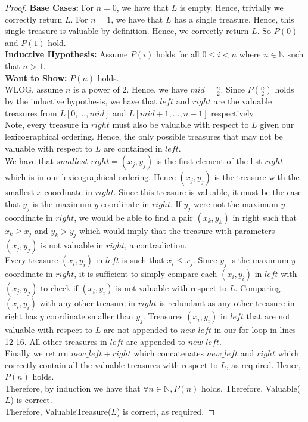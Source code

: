 \documentclass[12pt]{article}
\newcommand{\N}{\mathbb{N}}
\begin{document}
\begin{proof}
\textbf{Base Cases:} For $n = 0$, we have that $L$ is empty. Hence, trivially we correctly return $L$. For $n = 1$, we have that $L$ has a single treasure. Hence, this single treasure is valuable by definition. Hence, we correctly return $L$. So $P(0)$ and $P(1)$ hold. \\


\textbf{Inductive Hypothesis:} Assume $P(i)$ holds for all $0 \leq i < n$ where $n \in \N$ such that $n > 1$. \\

\textbf{Want to Show:} $P(n)$ holds. \\

WLOG, assume $n$ is a power of 2. Hence, we have $mid = \frac{n}{2}$. Since $P(\frac{n}{2})$ holds by the inductive hypothesis, we have that $left$ and $right$ are the valuable treasures from $L[0,...,mid]$ and $L[mid + 1,...,n-1]$ respectively. \\

Note, every treasure in $right$ must also be valuable with respect to $L$ given our lexicographical ordering. Hence, the only possible treasures that may not be valuable with respect to $L$ are contained in $left$. \\

We have that $smallest\_right = (x_j,y_j)$ is the first element of the list $right$ which is in our lexicographical ordering. Hence $(x_j,y_j)$ is the treasure with the smallest $x$-coordinate in $right$. Since this treasure is valuable, it must be the case that $y_j$ is the maximum $y$-coordinate in $right$. If $y_j$ were not the maximum $y$-coordinate in $right$, we would be able to find a pair $(x_k, y_k)$ in right such that $x_k \geq x_j$ and $y_k > y_j$ which would imply that the treasure with parameters $(x_j,y_j)$ is not valuable in $right$, a contradiction. \\

Every treasure $(x_i,y_i)$ in $left$ is such that $x_i \leq x_j$. Since $y_j$ is the maximum $y$-coordinate in $right$, it is sufficient to simply compare each $(x_i,y_i)$ in $left$ with $(x_j,y_j)$ to check if $(x_i,y_i)$ is not valuable with respect to $L$. Comparing $(x_i,y_i)$ with any other treasure in $right$ is redundant as any other treasure in right has $y$ coordinate smaller than $y_j$. Treasures $(x_i,y_i)$ in $left$ that are not valuable with respect to $L$ are not appended to $new\_left$ in our for loop in lines 12-16. All other treasures in $left$ are appended to $new\_left$. \\

Finally we return $new\_left + right$ which concatenates $new\_left$ and $right$ which correctly contain all the valuable treasures with respect to $L$, as required. Hence, $P(n)$ holds. \\

Therefore, by induction we have that $\forall n \in \N, P(n)$ holds. Therefore, Valuable($L$) is correct. \\

Therefore, ValuableTreasure($L$) is correct, as required. 
\end{proof}
\end{document}
